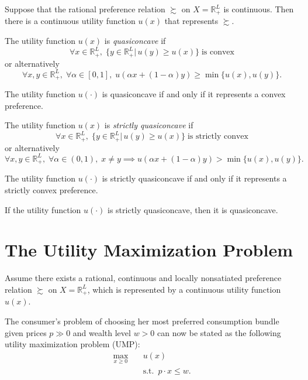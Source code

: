 \documentclass[11pt,fleqn]{book} %
\begin{document}
\begin{theorem}
	Suppose that the rational preference relation $\succsim$ on $X=\mathbb{R}_+^L$ is continuous.
	Then there is a continuous utility function $u(x)$ that represents $\succsim$.
\end{theorem}

\begin{definition}[Quasiconcavity]
	The utility function $u(x)$ is \emph{quasiconcave} if
	\[
	\forall x\in\mathbb{R}_+^L,\;\{y\in\mathbb{R}_+^L|\,u(y)\geqslant u(x)\}\;\text{is convex}
	\]
	or alternatively
	\[
	\forall x,y\in\mathbb{R}_+^L,\;\forall \alpha\in[0,1],\;u(\alpha x+(1-\alpha)y)\geqslant \min\{u(x),u(y)\}.
	\]
\end{definition}

\begin{proposition}
	The utility function $u(\cdot)$ is quasiconcave if and only if it represents a convex preference.
\end{proposition}


\begin{definition}
	The utility function $u(x)$ is \emph{strictly quasiconcave} if
	\[
	\forall x\in\mathbb{R}_+^L,\;\{y\in\mathbb{R}_+^L|\,u(y)\geqslant u(x)\}\;\text{is strictly convex}
	\]
	or alternatively
	\[
	\forall x,y\in\mathbb{R}_+^L,\;\forall \alpha\in(0,1),\;x\ne y\implies u(\alpha x+(1-\alpha)y)>\min\{u(x),u(y)\}.
	\]
\end{definition}

\begin{proposition}
	The utility function $u(\cdot)$ is strictly quasiconcave if and only if it represents a strictly convex preference.
\end{proposition}

\begin{proposition}
	If the utility function $u(\cdot)$ is strictly quasiconcave, then it is quasiconcave.
\end{proposition}


\section{The Utility Maximization Problem}

Assume there exists a rational, continuous and locally nonsatiated preference relation $\succsim$ on $X=\mathbb{R}_+^L$, which is represented by a continuous utility function $u(x)$. 

The consumer's problem of choosing her most preferred consumption bundle
given prices $p\gg 0$ and wealth level $w > 0$ can now be stated as the following utility maximization problem (UMP):
\begin{align*}
	\max_{x\ge 0} \quad & u(x) \\
	                    & \mathrm{s.t.}\ \; p\cdot x\le w.
\end{align*}
\end{document}
